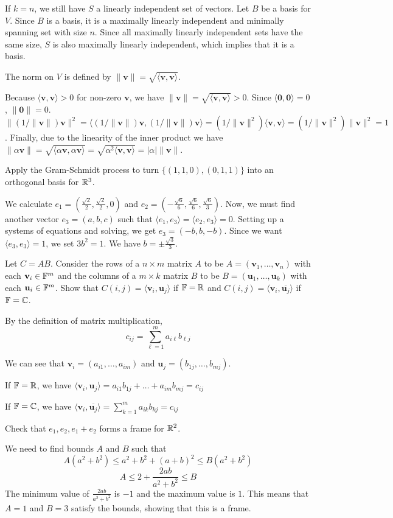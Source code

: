 \documentclass{scrartcl}
\newcommand{\bv}{\mathbf{v}}
\newcommand{\bu}{\mathbf{u}}
\newcommand{\angb}[1]{\langle #1 \rangle}
\begin{document}
If $k = n$, we still have $S$ a linearly independent set of vectors. Let $B$ be a basis
for $V$. Since $B$ is a basis, it is a maximally linearly independent and
minimally spanning set with size $n$.
Since all maximally linearly independent sets have the same size, $S$ is also maximally
linearly independent, which implies that it is a basis.

\begin{problem}
The norm on $V$ is defined by $\|\bv\| = \sqrt{\angb{\bv, \bv}}$.
\end{problem}
Because $\angb{\bv, \bv} > 0$ for non-zero $\bv$, we have $\|\bv\| =
    \sqrt{\angb{\bv, \bv}} > 0$. Since $\angb{\mathbf{0}, \mathbf{0}} = 0$,
$\|\mathbf{0}\| = 0$. $\|(1/\|\bv\|)\bv\|^2 = \angb{(1/\|\bv\|)\bv, (1/\|\bv\|)\bv}=
    (1/\|\bv\|^2)\angb{\bv, \bv} = (1/\|\bv\|^2)\|\bv\|^2 = 1$. Finally, due to
the linearity of the inner product we have $\|\alpha \bv\| =
    \sqrt{\angb{\alpha\bv, \alpha\bv}} = \sqrt{\alpha^2\angb{\bv, \bv}} =
    |\alpha|\|\bv\|$.


\begin{problem}
Apply the Gram-Schmidt process to turn $\{(1, 1, 0), (0,1,1)\}$ into
an orthogonal basis for $\mathbb R^3$.
\end{problem}
We calculate $e_1 = (\frac{\sqrt{2}}{2}, \frac{\sqrt{2}}{2}, 0)$ and
$e_2 = (-\frac{\sqrt{6}}{6}, \frac{\sqrt{6}}{6}, \frac{\sqrt{6}}{3})$. Now,
we must find another vector $e_3 = (a, b, c)$ such that $\angb{e_1, e_3} =
    \angb{e_2, e_3} = 0$. Setting up a systems of equations and solving, we get
$e_3 = (-b, b, -b)$. Since we want $\angb{e_3, e_3} = 1$, we set $3b^2 = 1$. We
have $b = \pm\frac{\sqrt{3}}{3}$.
\begin{problem}
Let $C = AB$.
Consider the rows of a $n \times m$ matrix $A$ to be $A = (\bv_1, \dots, \bv_n)$
with each $\bv_i \in \FF^m$
and the columns of a $m \times k$ matrix $B$ to be $B = (\bu_1, \dots, \bu_k)$
with each $\bu_i \in \FF^m$.
Show that $C(i, j) = \angb{\bv_i, \bu_j}$ if $\mathbb F = \mathbb R$ and $C(i, j) =
    \angb{\bv_i, \overline{\bu_j}}$ if $\mathbb F = \mathbb C$.
\end{problem}
By the definition of matrix multiplication,
\[c_{ij} = \sum_{\ell = 1}^m{a_{i\ell}b_{\ell j}}\]

We can see that $\bv_i = (a_{i1}, \dots, a_{im})$ and $\bu_j = (b_{1j}, \dots,
    b_{mj})$.

If $\mathbb F = \mathbb R$, we have $\angb{\bv_i, \bu_j} = a_{i1}b_{1j} + \dots
    + a_{im}b_{mj} = c_{ij}$

If $\mathbb F = \mathbb C$, we have $\angb{\bv_i, \overline{\bu_j}} = \sum_{k=1}^m
    {a_{ik}b_{kj}} = c_{ij}$
\begin{problem}
Check that $e_1, e_2, e_1 + e_2$ forms a frame for $\mathbb R^2$.
\end{problem}
We need to find bounds $A$ and $B$ such that
\[A(a^2 + b^2) \leq a^2 + b^2 + (a+b)^2 \leq B(a^2+b^2)\]
\[A \leq 2 + \frac{2ab}{a^2+b^2} \leq B\]
The minimum value of $\frac{2ab}{a^2+b^2}$ is $-1$ and the maximum value is
$1$. This means that $A = 1$ and $B = 3$ satisfy the bounds, showing that this
is a frame.
\end{document}
